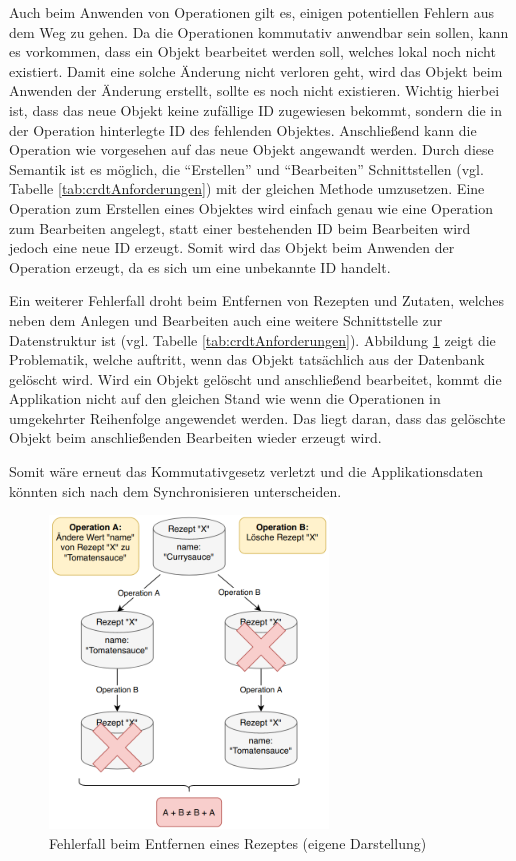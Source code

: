 \documentclass[a4paper, 12pt]{scrreprt}
\begin{document}
Auch beim Anwenden von Operationen gilt es, einigen potentiellen Fehlern aus dem Weg zu gehen. Da die Operationen kommutativ anwendbar sein sollen, kann es vorkommen, dass ein Objekt bearbeitet werden soll, welches lokal noch nicht existiert. Damit eine solche Änderung nicht verloren geht, wird das Objekt beim Anwenden der Änderung erstellt, sollte es noch nicht existieren. Wichtig hierbei ist, dass das neue Objekt keine zufällige ID zugewiesen bekommt, sondern die in der Operation hinterlegte ID des fehlenden Objektes. Anschließend kann die Operation wie vorgesehen auf das neue Objekt angewandt werden. Durch diese Semantik ist es möglich, die \enquote{Erstellen} und \enquote{Bearbeiten} Schnittstellen (vgl. Tabelle \ref{tab:crdtAnforderungen}) mit der gleichen Methode umzusetzen. Eine Operation zum Erstellen eines Objektes wird einfach genau wie eine Operation zum Bearbeiten angelegt, statt einer bestehenden ID beim Bearbeiten wird jedoch eine neue ID erzeugt. Somit wird das Objekt beim Anwenden der Operation erzeugt, da es sich um eine unbekannte ID handelt. 

Ein weiterer Fehlerfall droht beim Entfernen von Rezepten und Zutaten, welches neben dem Anlegen und Bearbeiten auch eine weitere Schnittstelle zur Datenstruktur ist (vgl. Tabelle \ref{tab:crdtAnforderungen}). Abbildung \ref{fig:rezeptLöschenSchlecht} zeigt die Problematik, welche auftritt, wenn das Objekt tatsächlich aus der Datenbank gelöscht wird. Wird ein Objekt gelöscht und anschließend bearbeitet, kommt die Applikation nicht auf den gleichen Stand wie wenn die Operationen in umgekehrter Reihenfolge angewendet werden. Das liegt daran, dass das gelöschte Objekt beim anschließenden Bearbeiten wieder erzeugt wird. 

Somit wäre erneut das Kommutativgesetz verletzt und die Applikationsdaten könnten sich nach dem Synchronisieren unterscheiden. 

\begin{figure}[H]
	\centering
	\includegraphics[width=0.66\textwidth]{deleteRecipeBad.png}
	\caption[Fehlerfall beim Entfernen eines Rezeptes]{Fehlerfall beim Entfernen eines Rezeptes (eigene Darstellung)}
	\label{fig:rezeptLöschenSchlecht}
\end{figure}
\end{document}
